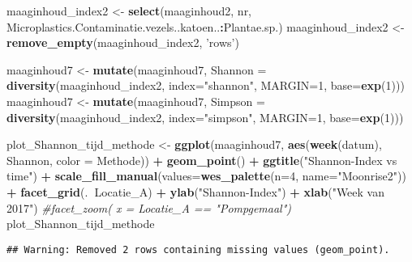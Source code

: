 \documentclass[]{article}
\newenvironment{Shaded}{\begin{snugshade}}{\end{snugshade}}
\newcommand{\KeywordTok}[1]{\textcolor[rgb]{0.13,0.29,0.53}{\textbf{#1}}}
\newcommand{\DataTypeTok}[1]{\textcolor[rgb]{0.13,0.29,0.53}{#1}}
\newcommand{\DecValTok}[1]{\textcolor[rgb]{0.00,0.00,0.81}{#1}}
\newcommand{\StringTok}[1]{\textcolor[rgb]{0.31,0.60,0.02}{#1}}
\newcommand{\CommentTok}[1]{\textcolor[rgb]{0.56,0.35,0.01}{\textit{#1}}}
\newcommand{\OperatorTok}[1]{\textcolor[rgb]{0.81,0.36,0.00}{\textbf{#1}}}
\newcommand{\NormalTok}[1]{#1}
\begin{document}
\begin{Shaded}
\begin{Highlighting}[]
\NormalTok{maaginhoud_index2 <-}\StringTok{ }\KeywordTok{select}\NormalTok{(maaginhoud2, nr, Microplastics.Contaminatie.vezels..katoen..}\OperatorTok{:}\NormalTok{Plantae.sp.)}
\NormalTok{maaginhoud_index2 <-}\StringTok{ }\KeywordTok{remove_empty}\NormalTok{(maaginhoud_index2, }\StringTok{'rows'}\NormalTok{)}


\NormalTok{maaginhoud7 <-}\StringTok{ }\KeywordTok{mutate}\NormalTok{(maaginhoud7, }\DataTypeTok{Shannon =} \KeywordTok{diversity}\NormalTok{(maaginhoud_index2, }\DataTypeTok{index=}\StringTok{"shannon"}\NormalTok{, }\DataTypeTok{MARGIN=}\DecValTok{1}\NormalTok{, }\DataTypeTok{base=}\KeywordTok{exp}\NormalTok{(}\DecValTok{1}\NormalTok{)))}
\NormalTok{maaginhoud7 <-}\StringTok{ }\KeywordTok{mutate}\NormalTok{(maaginhoud7, }\DataTypeTok{Simpson =} \KeywordTok{diversity}\NormalTok{(maaginhoud_index2, }\DataTypeTok{index=}\StringTok{"simpson"}\NormalTok{, }\DataTypeTok{MARGIN=}\DecValTok{1}\NormalTok{, }\DataTypeTok{base=}\KeywordTok{exp}\NormalTok{(}\DecValTok{1}\NormalTok{)))}

\NormalTok{plot_Shannon_tijd_methode <-}\StringTok{ }\KeywordTok{ggplot}\NormalTok{(maaginhoud7, }\KeywordTok{aes}\NormalTok{(}\KeywordTok{week}\NormalTok{(datum), Shannon, }\DataTypeTok{color =}\NormalTok{ Methode)) }\OperatorTok{+}
\StringTok{  }\KeywordTok{geom_point}\NormalTok{() }\OperatorTok{+}
\StringTok{  }\KeywordTok{ggtitle}\NormalTok{(}\StringTok{"Shannon-Index vs time"}\NormalTok{) }\OperatorTok{+}
\StringTok{  }\KeywordTok{scale_fill_manual}\NormalTok{(}\DataTypeTok{values=}\KeywordTok{wes_palette}\NormalTok{(}\DataTypeTok{n=}\DecValTok{4}\NormalTok{, }\DataTypeTok{name=}\StringTok{"Moonrise2"}\NormalTok{)) }\OperatorTok{+}\StringTok{ }
\StringTok{  }\KeywordTok{facet_grid}\NormalTok{(.}\OperatorTok{~}\NormalTok{Locatie_A) }\OperatorTok{+}
\StringTok{  }\KeywordTok{ylab}\NormalTok{(}\StringTok{"Shannon-Index"}\NormalTok{) }\OperatorTok{+}
\StringTok{  }\KeywordTok{xlab}\NormalTok{(}\StringTok{"Week van 2017"}\NormalTok{)}
  \CommentTok{#facet_zoom( x = Locatie_A == "Pompgemaal")}
\NormalTok{plot_Shannon_tijd_methode}
\end{Highlighting}
\end{Shaded}

\begin{verbatim}
## Warning: Removed 2 rows containing missing values (geom_point).
\end{verbatim}
\end{document}
